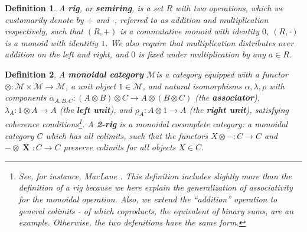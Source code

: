\documentclass{amsart} \usepackage{amsmath,amssymb,bbm}
\newcommand{\opname}[1]{\operatorname{#1}}
\newtheorem{definition}{Definition}
\newcommand{\catname}[1]{\boldsymbol{\opname{{#1}}}}
\begin{document}
\begin{definition}
  A {\textbf{rig}}, or {\textbf{semiring}}, is a set $R$ with two
  operations, which we customarily denote by $+$ and $\cdot$, referred to as
  addition and multiplication respectively, such that $( R, + )$ is a
  commutative monoid with identity $0$, $( R, \cdot )$ is a monoid with
  identitiy $1$.  We also require that multiplication distributes over
  addition on the left and right, and $0$ is fixed under multiplication by any
  $a \in R$.
\end{definition}

\begin{definition}
  \label{2rigdef}A {\textbf{monoidal category}} $\mathcal{M} $is a
  category equipped with a functor $\otimes : \mathcal{M \times
  \mathcal{M} \rightarrow \mathcal{M}}$, a unit object $1 \in
  \mathcal{M}$, and natural isomorphisms $\alpha, \lambda, \rho$ with
  components $\alpha_{A, B, C} : ( A \otimes B ) \otimes C \rightarrow
  A \otimes ( B \otimes C )$ (the {\textbf{associator}}), $\lambda_A :
  1 \otimes A \rightarrow A$ (the {\textbf{left unit}}), and $\rho_A :
  A \otimes 1 \rightarrow A$ (the {\textbf{right unit}}), satisfying
  coherence conditions{\footnote{See, for instance, MacLane
  {\cite{maclane}}.  This definition includes slightly more than the
  definition of a rig because we here explain the generalization of
  associativity for the monoidal operation.  Also, we extend the
  ``addition'' operation to general colimits - of which coproducts,
  the equivalent of binary sums, are an example.  Otherwise, the two
  defenitions have the same form.}}.  A {\textbf{2-rig}} is a monoidal
  cocomplete category: a monoidal category $C$ which has all
  colimits, such that the functors $X \otimes - : C \rightarrow C$ and
  $- \otimes \catname{X} : C \rightarrow C$ preserve colimits for all objects $X
  \in C$.
\end{definition}
\end{document}
